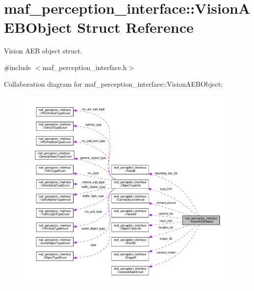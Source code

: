 \hypertarget{structmaf__perception__interface_1_1VisionAEBObject}{}\section{maf\+\_\+perception\+\_\+interface\+:\+:Vision\+A\+E\+B\+Object Struct Reference}
\label{structmaf__perception__interface_1_1VisionAEBObject}


Vision A\+EB object struct.  




{\ttfamily \#include $<$maf\+\_\+perception\+\_\+interface.\+h$>$}



Collaboration diagram for maf\+\_\+perception\+\_\+interface\+:\+:Vision\+A\+E\+B\+Object\+:\nopagebreak
\begin{figure}[H]
\begin{center}
\leavevmode
\includegraphics[width=350pt]{structmaf__perception__interface_1_1VisionAEBObject__coll__graph}
\end{center}
\end{figure}
